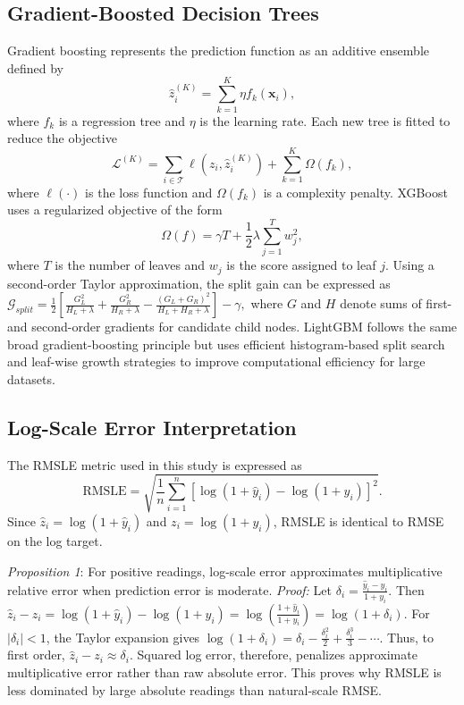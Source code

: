 \documentclass[conference]{IEEEtran}
\begin{document}
\subsection{Gradient-Boosted Decision Trees}
Gradient boosting represents the prediction function as an additive ensemble defined by
\begin{equation}
    \hat{z}_i^{(K)}=\sum_{k=1}^{K}\eta f_k(\mathbf{x}_i),
    \label{eq:gb_additive}
\end{equation}
where $f_k$ is a regression tree and $\eta$ is the learning rate. Each new tree is fitted to reduce the objective
\begin{equation}
    \mathcal{L}^{(K)} =
    \sum_{i\in\mathcal{T}}
    \ell\left(z_i,\hat{z}_i^{(K)}\right)
    +\sum_{k=1}^{K}\Omega(f_k),
    \label{eq:gb_objective}
\end{equation}
where $\ell(\cdot)$ is the loss function and $\Omega(f_k)$ is a complexity penalty. XGBoost uses a regularized objective of the form
\begin{equation}
    \Omega(f)=\gamma T+\frac{1}{2}\lambda\sum_{j=1}^{T}w_j^2,
    \label{eq:xgb_complexity}
\end{equation}
where $T$ is the number of leaves and $w_j$ is the score assigned to leaf $j$. Using a second-order Taylor approximation, the split gain can be expressed as
$    \mathcal{G}_{split}
    =
    \frac{1}{2}\left[
    \frac{G_L^2}{H_L+\lambda}
    +
    \frac{G_R^2}{H_R+\lambda}
    -
    \frac{(G_L+G_R)^2}{H_L+H_R+\lambda}
    \right]-\gamma,$ where $G$ and $H$ denote sums of first- and second-order gradients for candidate child nodes. LightGBM follows the same broad gradient-boosting principle but uses efficient histogram-based split search and leaf-wise growth strategies to improve computational efficiency for large datasets.

\subsection{Log-Scale Error Interpretation}
The RMSLE metric used in this study is expressed as
\begin{equation}
    \mathrm{RMSLE}
    =
    \sqrt{
    \frac{1}{n}
    \sum_{i=1}^{n}
    \left[
    \log(1+\hat{y}_i)-\log(1+y_i)
    \right]^2
    }.
    \label{eq:rmsle}
\end{equation}
Since $\hat{z}_i=\log(1+\hat{y}_i)$ and $z_i=\log(1+y_i)$, RMSLE is identical to RMSE on the log target.

\textit{Proposition 1}: For positive readings, log-scale error approximates multiplicative relative error when prediction error is moderate. \noindent\emph{Proof:} Let $\delta_i=\frac{\hat{y}_i-y_i}{1+y_i}$. Then
$    \hat{z}_i-z_i
    =\log(1+\hat{y}_i)-\log(1+y_i) \nonumber
    =\log\left(\frac{1+\hat{y}_i}{1+y_i}\right) \nonumber
    =\log(1+\delta_i).$ For $|\delta_i|<1$, the Taylor expansion gives
$    \log(1+\delta_i)=\delta_i-\frac{\delta_i^2}{2}+\frac{\delta_i^3}{3}-\cdots.$ Thus, to first order, $\hat{z}_i-z_i\approx \delta_i$. Squared log error, therefore, penalizes approximate multiplicative error rather than raw absolute error. This proves why RMSLE is less dominated by large absolute readings than natural-scale RMSE. 
\end{document}

